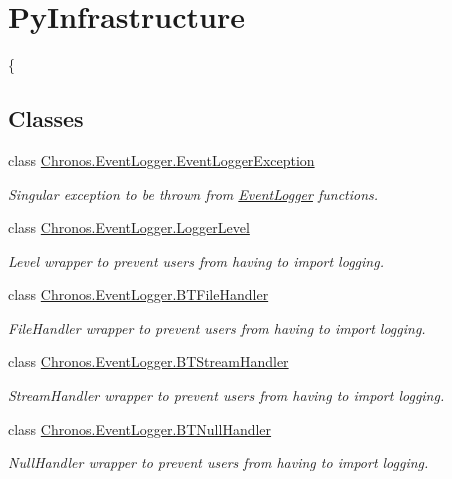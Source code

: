 \hypertarget{group__PyInfrastructure}{}\section{Py\+Infrastructure}
\label{group__PyInfrastructure}


\{  


\subsection*{Classes}
\begin{DoxyCompactItemize}
\item 
class \hyperlink{classChronos_1_1EventLogger_1_1EventLoggerException}{Chronos.\+Event\+Logger.\+Event\+Logger\+Exception}
\begin{DoxyCompactList}\small\item\em Singular exception to be thrown from \hyperlink{classChronos_1_1EventLogger_1_1EventLogger}{Event\+Logger} functions. \end{DoxyCompactList}\item 
class \hyperlink{classChronos_1_1EventLogger_1_1LoggerLevel}{Chronos.\+Event\+Logger.\+Logger\+Level}
\begin{DoxyCompactList}\small\item\em Level wrapper to prevent users from having to import logging. \end{DoxyCompactList}\item 
class \hyperlink{classChronos_1_1EventLogger_1_1BTFileHandler}{Chronos.\+Event\+Logger.\+B\+T\+File\+Handler}
\begin{DoxyCompactList}\small\item\em File\+Handler wrapper to prevent users from having to import logging. \end{DoxyCompactList}\item 
class \hyperlink{classChronos_1_1EventLogger_1_1BTStreamHandler}{Chronos.\+Event\+Logger.\+B\+T\+Stream\+Handler}
\begin{DoxyCompactList}\small\item\em Stream\+Handler wrapper to prevent users from having to import logging. \end{DoxyCompactList}\item 
class \hyperlink{classChronos_1_1EventLogger_1_1BTNullHandler}{Chronos.\+Event\+Logger.\+B\+T\+Null\+Handler}
\begin{DoxyCompactList}\small\item\em Null\+Handler wrapper to prevent users from having to import logging. \end{DoxyCompactList}\item 

\end{DoxyCompactItemize}
